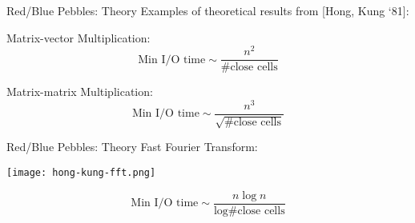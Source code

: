 \documentclass[english,compress]{beamer}
\begin{document}
\begin{frame}{Red/Blue Pebbles: Theory}
  Examples of theoretical results from [Hong, Kung `81]:

  \bigskip
  Matrix-vector Multiplication:
  \[
    \text{Min I/O time}\sim \frac{n^2}{\text{\# close cells}}
  \]

  \bigskip
  Matrix-matrix Multiplication:
  \[
    \text{Min I/O time}\sim \frac{n^3}{\sqrt{\text{\# close cells}}
    }
  \]
\end{frame}

\begin{frame}{Red/Blue Pebbles: Theory}
  Fast Fourier Transform:
  \begin{center}
    \texttt{[image: hong-kung-fft.png]}
  \end{center}
  \[
    \text{Min I/O time}\sim \frac{n \log n}{\log \text{\# close cells}}
  \]
\end{frame}
\end{document}
